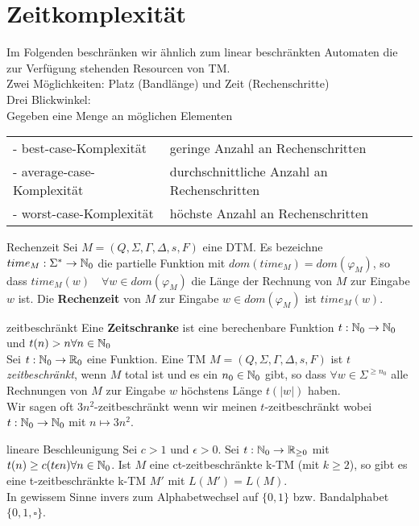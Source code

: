 \section{Zeitkomplexität}

Im Folgenden beschränken wir ähnlich zum linear beschränkten Automaten die zur Verfügung stehenden Resourcen von TM.\\
Zwei Möglichkeiten: Platz (Bandlänge) und Zeit (Rechenschritte)\\

Drei Blickwinkel:\\
Gegeben eine Menge an möglichen Elementen\\
\begin{tabular}{ll}
     - best-case-Komplexität & geringe Anzahl an Rechenschritten \\
     - average-case-Komplexität & durchschnittliche Anzahl an Rechenschritten \\
     - worst-case-Komplexität & höchste Anzahl an Rechenschritten
\end{tabular}

\begin{defn}{Rechenzeit}
    Sei $M = (Q, \Sigma, \Gamma, \Delta, s, F)$ eine DTM. Es bezeichne $ time_M : \Sigma^* \to \mathbb{N}_0 $ die partielle Funktion mit $dom(time_M) = dom(\varphi_M)$, so dass $time_M(w) \quad \forall w \in dom(\varphi_M)$ die Länge der Rechnung von $M$ zur Eingabe $w$ ist. Die \textbf{Rechenzeit} von $M$ zur Eingabe $w \in dom(\varphi_M)$ ist $time_M(w)$.
\end{defn}

\begin{defn}{zeitbeschränkt}
    Eine \textbf{Zeitschranke} ist eine berechenbare Funktion $t : \mathbb{N}_0 \to \mathbb{N}_0$ und $t(n) > n \forall n \in \mathbb{N}_0$\\
    Sei $t : \mathbb{N}_0 \to \mathbb{R}_0$ eine Funktion. Eine TM $M = (Q, \Sigma, \Gamma, \Delta, s, F)$ ist $t$ \textit{zeitbeschränkt}, wenn $M$ total ist und es ein $n_0 \in \mathbb{N}_0$ gibt, so dass $\forall w \in \Sigma^{\geq n_0}$ alle Rechnungen von $M$ zur Eingabe $w$ höchstens Länge $t(|w|)$ haben.\\
    Wir sagen oft $3n^2$-zeitbeschränkt wenn wir meinen $t$-zeitbeschränkt wobei $t : \mathbb{N}_0 \to \mathbb{N}_0$ mit $n \mapsto 3n^2$.
\end{defn}

\begin{satz}{lineare Beschleunigung}
    Sei $c > 1$ und $\epsilon > 0$. Sei $t : \mathbb{N}_0 \to \mathbb{R}_{\geq 0}$ mit $t(n) \geq c(t \epsilon n) \forall n \in \mathbb{N}_0 $. Ist $M$ eine ct-zeitbeschränkte k-TM (mit $k \geq 2$), so gibt es eine t-zeitbeschränkte k-TM $M'$ mit $L(M') = L(M)$.\\
    In gewissem Sinne invers zum Alphabetwechsel auf $\{0, 1\}$ bzw. Bandalphabet $\{0, 1, \square\}$.
\end{satz}

